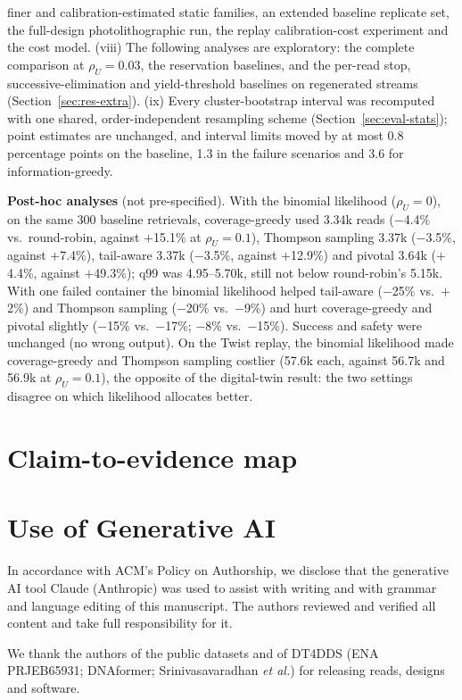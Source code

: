\documentclass[acmsmall,screen]{acmart}
\begin{document}
finer and calibration-estimated static families, an extended baseline replicate set, the full-design
photolithographic run, the replay calibration-cost experiment and the cost model.  (viii) The following analyses
are exploratory: the complete comparison at $\rho_U{=}0.03$, the reservation
baselines, and the per-read stop, successive-elimination and yield-threshold baselines on regenerated
streams (Section~\ref{sec:res-extra}).  (ix) Every cluster-bootstrap interval was
recomputed with one shared, order-independent resampling scheme (Section~\ref{sec:eval-stats}); point
estimates are unchanged, and interval limits moved by at most 0.8 percentage points on the baseline,
1.3 in the failure scenarios and 3.6 for information-greedy.

\textbf{Post-hoc analyses} (not pre-specified).  With the binomial likelihood ($\rho_U{=}0$), on the same
300 baseline retrievals, coverage-greedy used 3.34k reads ($-$4.4\% vs.\ round-robin, against $+$15.1\%
at $\rho_U{=}0.1$), Thompson sampling 3.37k ($-$3.5\%, against $+$7.4\%), tail-aware 3.37k ($-$3.5\%,
against $+$12.9\%) and pivotal 3.64k ($+$4.4\%, against $+$49.3\%); q99 was 4.95--5.70k, still not below
round-robin's 5.15k.  With one failed container the binomial likelihood helped tail-aware ($-$25\% vs.\
$+$2\%) and Thompson sampling ($-$20\% vs.\ $-$9\%) and hurt coverage-greedy and pivotal slightly
($-$15\% vs.\ $-$17\%; $-$8\% vs.\ $-$15\%).  Success and safety were unchanged (no wrong output).  On the
Twist replay, the binomial likelihood made coverage-greedy and Thompson sampling costlier (57.6k each,
against 56.7k and 56.9k at $\rho_U{=}0.1$), the opposite of the digital-twin result: the two settings
disagree on which likelihood allocates better.

\section{Claim-to-evidence map}\label{supp:evidence}


\section*{Use of Generative AI}
In accordance with ACM's Policy on Authorship, we disclose that the generative AI tool Claude (Anthropic)
was used to assist with writing and with grammar and language editing of this manuscript.  The authors
reviewed and verified all content and take full responsibility for it.

\begin{acks}
We thank the authors of the public datasets and of DT4DDS (ENA PRJEB65931; DNAformer;
Srinivasavaradhan \emph{et al.}) for releasing reads, designs and software.
\end{acks}



\end{document}
